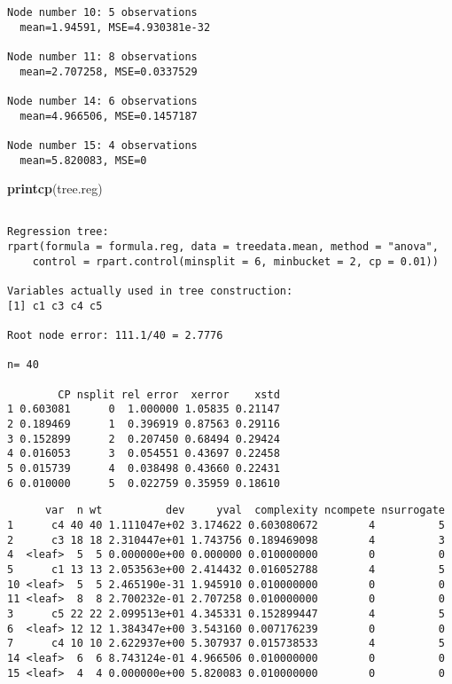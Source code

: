 \documentclass[]{article}
\newenvironment{Shaded}{\begin{snugshade}}{\end{snugshade}}
\newcommand{\KeywordTok}[1]{\textcolor[rgb]{0.13,0.29,0.53}{\textbf{{#1}}}}
\newcommand{\NormalTok}[1]{{#1}}
\begin{document}
\begin{verbatim}
Node number 10: 5 observations
  mean=1.94591, MSE=4.930381e-32 

Node number 11: 8 observations
  mean=2.707258, MSE=0.0337529 

Node number 14: 6 observations
  mean=4.966506, MSE=0.1457187 

Node number 15: 4 observations
  mean=5.820083, MSE=0 
\end{verbatim}

\begin{Shaded}
\begin{Highlighting}[]
\KeywordTok{printcp}\NormalTok{(tree.reg)}
\end{Highlighting}
\end{Shaded}

\begin{verbatim}

Regression tree:
rpart(formula = formula.reg, data = treedata.mean, method = "anova", 
    control = rpart.control(minsplit = 6, minbucket = 2, cp = 0.01))

Variables actually used in tree construction:
[1] c1 c3 c4 c5

Root node error: 111.1/40 = 2.7776

n= 40 

        CP nsplit rel error  xerror    xstd
1 0.603081      0  1.000000 1.05835 0.21147
2 0.189469      1  0.396919 0.87563 0.29116
3 0.152899      2  0.207450 0.68494 0.29424
4 0.016053      3  0.054551 0.43697 0.22458
5 0.015739      4  0.038498 0.43660 0.22431
6 0.010000      5  0.022759 0.35959 0.18610
\end{verbatim}

\begin{Shaded}
\end{Shaded}

\begin{verbatim}
      var  n wt          dev     yval  complexity ncompete nsurrogate
1      c4 40 40 1.111047e+02 3.174622 0.603080672        4          5
2      c3 18 18 2.310447e+01 1.743756 0.189469098        4          3
4  <leaf>  5  5 0.000000e+00 0.000000 0.010000000        0          0
5      c1 13 13 2.053563e+00 2.414432 0.016052788        4          5
10 <leaf>  5  5 2.465190e-31 1.945910 0.010000000        0          0
11 <leaf>  8  8 2.700232e-01 2.707258 0.010000000        0          0
3      c5 22 22 2.099513e+01 4.345331 0.152899447        4          5
6  <leaf> 12 12 1.384347e+00 3.543160 0.007176239        0          0
7      c4 10 10 2.622937e+00 5.307937 0.015738533        4          5
14 <leaf>  6  6 8.743124e-01 4.966506 0.010000000        0          0
15 <leaf>  4  4 0.000000e+00 5.820083 0.010000000        0          0
\end{verbatim}
\end{document}
